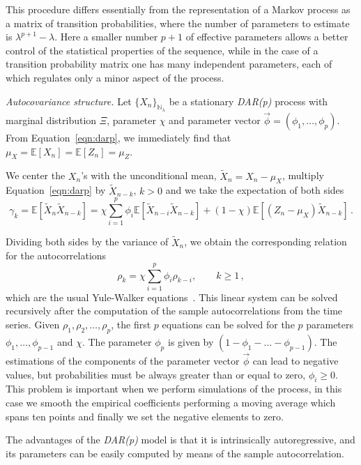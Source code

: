 \documentclass[12pt]{iopart}
\begin{document}
This procedure differs essentially from the representation of a Markov process as a matrix of transition probabilities, where the number of parameters to estimate is $\lambda^{p+1}-\lambda$. Here a smaller number $p+1$ of effective parameters allows a better control of the statistical properties of the sequence, while in the case of a transition probability matrix one has many independent parameters, each of which regulates only a minor aspect of the process.

{\it Autocovariance structure.}
Let $\lbrace X_n \rbrace_{\mathbb{N}_\lambda}$ be a stationary \textit{DAR(p)} process with marginal distribution $\Xi$, parameter $\chi$ and parameter vector $\vec{\phi}=(\phi_1,\ldots,\phi_p)$. From Equation~\ref{eqn:darp}, we immediately find that $\mu_X=\mathbb{E}[X_n]=\mathbb{E}[Z_n]=\mu_Z$.

We center the $X_n$'s with the unconditional mean, $\widetilde{X}_n = X_n-\mu_X$, multiply Equation~\ref{eqn:darp} by $\widetilde{X}_{n-k}$, $k>0$ and we take the expectation of both sides
\begin{equation*}
  \gamma_k=\mathbb{E}[\widetilde{X}_n \widetilde{X}_{n-k}]=\chi\sum_{i=1}^p \phi_i \mathbb{E}[\widetilde{X}_{n-i}\widetilde{X}_{n-k}]+(1-\chi)\mathbb{E}[(Z_n-\mu_X)\widetilde{X}_{n-k}]\,.
\end{equation*}

Dividing both sides by the variance of $\widetilde{X}_n$, we obtain the corresponding relation for the autocorrelations
\begin{equation}
  \rho_k=\chi \sum_{i=1}^p \phi_i \rho_{k-i}, \qquad k\geqslant 1\,,
  \label{eqn:YuleWalker}
\end{equation}
which are the usual Yule-Walker equations~\cite{hamilton1994time}. This linear system can be solved recursively after the computation of the sample autocorrelations from the time series. Given $\rho_1,\rho_2,\ldots,\rho_p$, the first $p$ equations can be solved for the $p$ parameters $\phi_1,\ldots,\phi_{p-1}$ and $\chi$. The parameter $\phi_p$ is given by $(1-\phi_1-\ldots-\phi_{p-1})$. The estimations of the components of the parameter vector $\vec{\phi}$ can lead to negative values, but probabilities must be always greater than or equal to zero, $\phi_i \geq 0$. This problem is important when we perform simulations of the process, in this case we smooth the empirical coefficients performing a moving average which spans ten points and finally we set the negative elements to zero.

The advantages of the \textit{DAR(p)} model is that it is intrinsically autoregressive, and its parameters can be easily computed by means of the sample autocorrelation.
\end{document}
